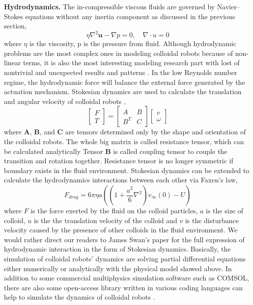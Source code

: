 \textbf{Hydrodynamics.}  The in-compressible viscous fluids are governed by Navier–Stokes equations without any inertia component as discussed in the previous section,
\begin{equation}
    \eta \nabla^2\textbf{u}-\nabla p=0,\quad \nabla \cdot u=0
\end{equation}
where $\eta$ is the viscosity, p is the pressure from fluid. Although hydrodynamic problems are the most complex ones in modeling colloidal robots because of non-linear terms, it is also the most interesting modeling research part with lost of  nontrivial and unexpected results and patterns \autocite{Lauga2009,berke2008hydrodynamic,lauga2011life}. In the low Reynolds number regime, the hydrodynamic force will balance the external force generated by the actuation mechanism. Stokesian dynamics are used to calculate the  translation and angular velocity of colloidal robots \autocite{Brady1988a,Kim2005},
\begin{equation}
    \left[ \begin{array}{c} F \\ T \end{array} \right] = \begin{bmatrix} A & B \\ B^T & C \end{bmatrix} \left[ \begin{array}{c} v \\ \omega \end{array} \right]
\end{equation}
where \textbf{A}, \textbf{B}, and \textbf{C} are tensors determined only by the shape and orientation of the colloidal robots. The whole big matrix is called resistance tensor, which can be calculated analytically\autocite{Kim2005}  Tensor \textbf{B} is called coupling tensor to couple the transition and rotation together. Resistance tensor is no longer symmetric if boundary exists in the fluid environment.  Stokesian dynamics  can be extended to calculate the hydrodynamics interactions between each other via Faxen's law,
\begin{equation}
    F_{drag}=6 \pi \eta a((1+\frac{a^2}{6}\nabla^2)v_{\infty}(0)-U)
\end{equation}
where $F$ is the   force exerted by the fluid on the colloid particles, $a$ is the size of colloid, $u$ is the  the translation  velocity of the colloid and $v$ is the disturbance velocity caused by the presence of other colloids in the fluid environment. We would rather direct our readers to James Swan's paper for the full expression of hydrodynamic interaction in the form of Stokesian dynamics\autocite{swan2011modeling}. Basically, the simulation of colloidal robots' dynamics are solving partial differential equations either numerically or analytically with the physical model showed above. In addition to some commercial multiphysics simulation software such as COMSOL\textregistered, there are also some open-access library written in various coding languages  can help to simulate the dynamics of colloidal robots \autocite{glaser2015strong,anderson2008general,swan2011modeling,singh2019hydrodynamic}.

